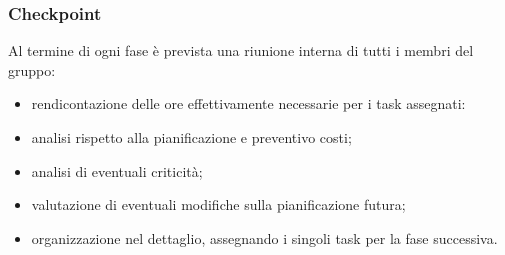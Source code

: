 \subsubsection{Checkpoint}
Al termine di ogni fase è prevista una riunione interna di tutti i membri del gruppo:
    \begin{itemize}
        \item rendicontazione delle ore effettivamente necessarie per i task assegnati:
        \item analisi rispetto alla pianificazione e preventivo costi;
        \item analisi di eventuali criticità;
        \item valutazione di eventuali modifiche sulla pianificazione futura;
        \item organizzazione nel dettaglio, assegnando i singoli task per la fase successiva. 
    \end{itemize}
